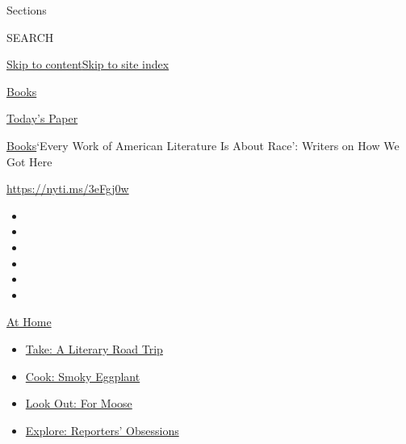 Sections

SEARCH

\protect\hyperlink{site-content}{Skip to
content}\protect\hyperlink{site-index}{Skip to site index}

\href{https://www.nytimes.com/section/books}{Books}

\href{https://myaccount.nytimes.com/auth/login?response_type=cookie\&client_id=vi}{}

\href{https://www.nytimes.com/section/todayspaper}{Today's Paper}

\href{/section/books}{Books}\textbar{}`Every Work of American Literature
Is About Race': Writers on How We Got Here

\url{https://nyti.ms/3eFgj0w}

\begin{itemize}
\item
\item
\item
\item
\item
\item
\end{itemize}

\href{https://www.nytimes.com/spotlight/at-home?action=click\&pgtype=Article\&state=default\&region=TOP_BANNER\&context=at_home_menu}{At
Home}

\begin{itemize}
\tightlist
\item
  \href{https://www.nytimes.com/2020/07/28/books/time-for-a-literary-road-trip.html?action=click\&pgtype=Article\&state=default\&region=TOP_BANNER\&context=at_home_menu}{Take:
  A Literary Road Trip}
\item
  \href{https://www.nytimes.com/2020/07/29/magazine/bored-with-your-home-cooking-some-smoky-eggplant-will-fix-that.html?action=click\&pgtype=Article\&state=default\&region=TOP_BANNER\&context=at_home_menu}{Cook:
  Smoky Eggplant}
\item
  \href{https://www.nytimes.com/2020/07/27/travel/moose-michigan-isle-royale.html?action=click\&pgtype=Article\&state=default\&region=TOP_BANNER\&context=at_home_menu}{Look
  Out: For Moose}
\item
  \href{https://www.nytimes.com/interactive/2020/at-home/even-more-reporters-editors-diaries-lists-recommendations.html?action=click\&pgtype=Article\&state=default\&region=TOP_BANNER\&context=at_home_menu}{Explore:
  Reporters' Obsessions}
\end{itemize}

